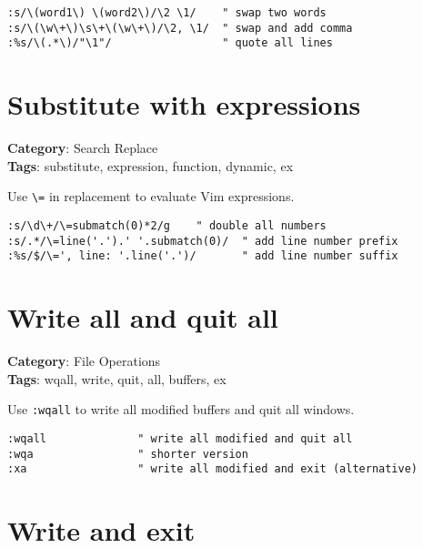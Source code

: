 {{{{{\begin{Exa*}{}
\begin{Verbatim}[fontsize=\footnotesize, breaklines, breakanywhere]
:s/\(word1\) \(word2\)/\2 \1/    " swap two words
:s/\(\w\+\)\s\+\(\w\+\)/\2, \1/  " swap and add comma
:%s/\(.*\)/"\1"/                 " quote all lines
\end{Verbatim}
\end{Exa*}

\section{Substitute with expressions}

\textbf{Category}: Search Replace\\ \textbf{Tags}: substitute, expression, function, dynamic, ex
\vspace{0.5cm}

Use {\footnotesize \Verb§\=§} in replacement to evaluate Vim expressions.

\begin{Exa*}{}
\begin{Verbatim}[fontsize=\footnotesize, breaklines, breakanywhere]
:s/\d\+/\=submatch(0)*2/g    " double all numbers
:s/.*/\=line('.').' '.submatch(0)/  " add line number prefix
:%s/$/\=', line: '.line('.')/       " add line number suffix
\end{Verbatim}
\end{Exa*}

\section{Write all and quit all}

\textbf{Category}: File Operations\\ \textbf{Tags}: wqall, write, quit, all, buffers, ex
\vspace{0.5cm}

Use {\footnotesize \Verb§:wqall§} to write all modified buffers and quit all windows.

\begin{Exa*}{}
\begin{Verbatim}[fontsize=\footnotesize, breaklines, breakanywhere]
:wqall              " write all modified and quit all
:wqa                " shorter version
:xa                 " write all modified and exit (alternative)
\end{Verbatim}
\end{Exa*}

\section{Write and exit}

}}}}}
